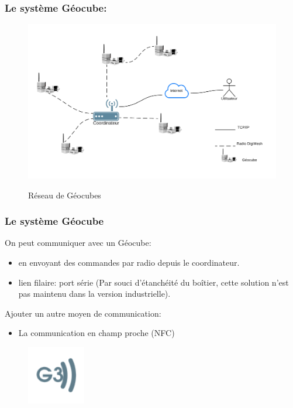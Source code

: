 \documentclass{beamer}
\begin{document}
\begin{frame}
\frametitle{Le système Géocube:}
\begin{figure}
\centering
\includegraphics[scale=0.53]{images/grid.png}
\label{fig:grid}
\caption{Réseau de Géocubes}
\end{figure}
\end{frame}

\begin{frame}
\frametitle{Le système Géocube}
On peut communiquer avec un Géocube:
\begin{itemize}
\item en envoyant des commandes par radio depuis le coordinateur.
\item lien filaire: port série (Par souci d'étanchéité du boîtier, cette solution n'est pas maintenu dans la version industrielle).
\end{itemize}

Ajouter un autre moyen de communication:
\begin{itemize}
\item La communication en champ proche (NFC)
\end{itemize}
\begin{figure}
\centering
\includegraphics[scale=0.7]{images/g3nfc.png}
\end{figure}
\end{frame}

\end{document}
